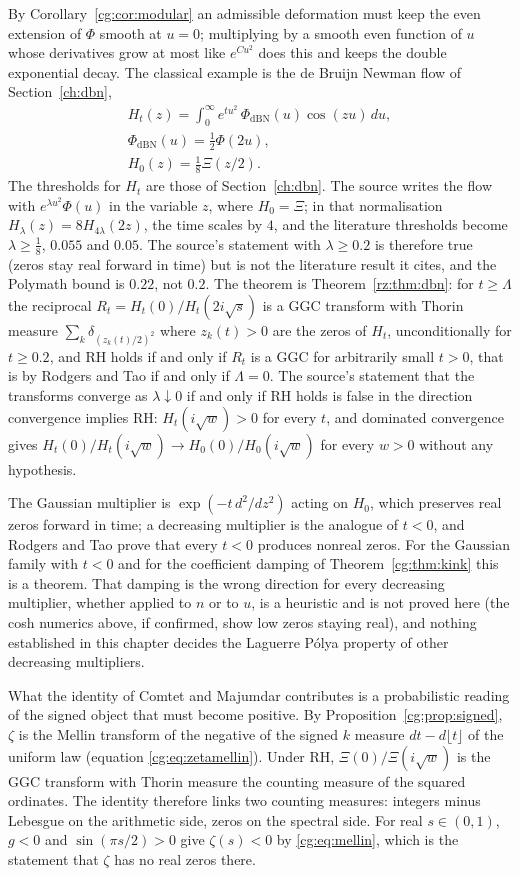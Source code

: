 By Corollary~\ref{cg:cor:modular} an admissible deformation must keep the even extension of $\Phi$ smooth at $u=0$; multiplying by a smooth even function of $u$ whose derivatives grow at most like $e^{Cu^2}$ does this and keeps the double exponential decay. The classical example is the de Bruijn Newman flow of Section~\ref{ch:dbn},
\[
\begin{gathered}H_t(z)=\int_0^\infty e^{tu^2}\,\Phi_{\mathrm{dBN}}(u)\cos(zu)\,du,\\ \Phi_{\mathrm{dBN}}(u)=\tfrac12\Phi(2u),\\ H_0(z)=\tfrac18\Xi(z/2).\end{gathered}
\]
The thresholds for $H_t$ are those of Section~\ref{ch:dbn}. The source writes the flow with $e^{\lambda u^2}\Phi(u)$ in the variable $z$, where $H_0=\Xi$; in that normalisation $H_\lambda(z)=8H_{4\lambda}(2z)$, the time scales by $4$, and the literature thresholds become $\lambda\ge\frac18$, $0.055$ and $0.05$. The source's statement with $\lambda\ge0.2$ is therefore true (zeros stay real forward in time) but is not the literature result it cites, and the Polymath bound is $0.22$, not $0.2$. The theorem is Theorem~\ref{rz:thm:dbn}: for $t\ge\Lambda$ the reciprocal $R_t=H_t(0)/H_t(2i\sqrt s)$ is a GGC transform with Thorin measure $\sum_k\delta_{(z_k(t)/2)^2}$ where $z_k(t)>0$ are the zeros of $H_t$, unconditionally for $t\ge0.2$, and RH holds if and only if $R_t$ is a GGC for arbitrarily small $t>0$, that is by Rodgers and Tao if and only if $\Lambda=0$. The source's statement that the transforms converge as $\lambda\downarrow0$ if and only if RH holds is false in the direction convergence implies RH: $H_t(i\sqrt w)>0$ for every $t$, and dominated convergence gives $H_t(0)/H_t(i\sqrt w)\to H_0(0)/H_0(i\sqrt w)$ for every $w>0$ without any hypothesis.

The Gaussian multiplier is $\exp(-t\,d^2/dz^2)$ acting on $H_0$, which preserves real zeros forward in time; a decreasing multiplier is the analogue of $t<0$, and Rodgers and Tao prove that every $t<0$ produces nonreal zeros. For the Gaussian family with $t<0$ and for the coefficient damping of Theorem~\ref{cg:thm:kink} this is a theorem. That damping is the wrong direction for every decreasing multiplier, whether applied to $n$ or to $u$, is a heuristic and is not proved here (the cosh numerics above, if confirmed, show low zeros staying real), and nothing established in this chapter decides the Laguerre P\'olya property of other decreasing multipliers.

What the identity of Comtet and Majumdar contributes is a probabilistic reading of the signed object that must become positive. By Proposition~\ref{cg:prop:signed}, $\zeta$ is the Mellin transform of the negative of the signed $k$ measure $dt-d\lfloor t\rfloor$ of the uniform law (equation \eqref{cg:eq:zetamellin}). Under RH, $\Xi(0)/\Xi(i\sqrt w)$ is the GGC transform with Thorin measure the counting measure of the squared ordinates. The identity therefore links two counting measures: integers minus Lebesgue on the arithmetic side, zeros on the spectral side. For real $s\in(0,1)$, $g<0$ and $\sin(\pi s/2)>0$ give $\zeta(s)<0$ by \eqref{cg:eq:mellin}, which is the statement that $\zeta$ has no real zeros there.

